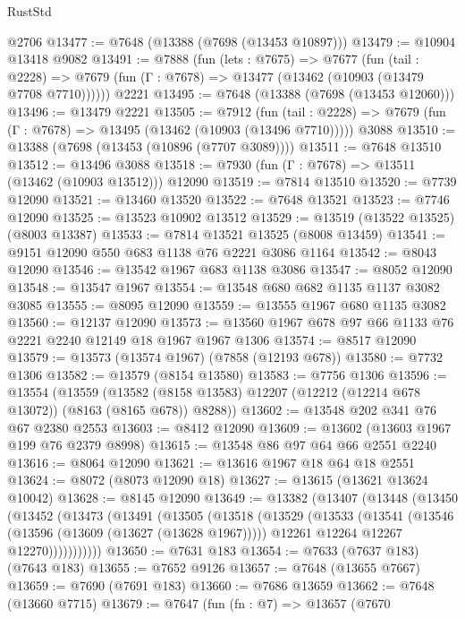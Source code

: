 \begin{lexlean}{RustStd}
\begin{coremodule}
{\begin{coremodule}
{{{{{{{{{{{{{{{{{{{{{{{{{{{{{{{{{{{{{{{{{{{{{{{{{{{{{    @2706
@13477 := @7648 (@13388 (@7698 (@13453 @10897)))
@13479 := @10904 @13418 @9082
@13491 := @7888
    (fun (lets : @7675) =>
    @7677
      (fun (tail : @2228) =>
      @7679 (fun (Γ : @7678) => @13477 (@13462 (@10903 (@13479 @7708 @7710))))))
    @2221
@13495 := @7648 (@13388 (@7698 (@13453 @12060)))
@13496 := @13479 @2221
@13505 := @7912
    (fun (tail : @2228) => @7679 (fun (Γ : @7678) => @13495 (@13462 (@10903 (@13496 @7710)))))
    @3088
@13510 := @13388 (@7698 (@13453 (@10896 (@7707 @3089))))
@13511 := @7648 @13510
@13512 := @13496 @3088
@13518 := @7930 (fun (Γ : @7678) => @13511 (@13462 (@10903 @13512))) @12090
@13519 := @7814 @13510
@13520 := @7739 @12090
@13521 := @13460 @13520
@13522 := @7648 @13521
@13523 := @7746 @12090
@13525 := @13523 @10902 @13512
@13529 := @13519 (@13522 @13525) (@8003 @13387)
@13533 := @7814 @13521 @13525 (@8008 @13459)
@13541 := @9151 @12090 @550 @683 @1138 @76 @2221 @3086 @1164
@13542 := @8043 @12090
@13546 := @13542 @1967 @683 @1138 @3086
@13547 := @8052 @12090
@13548 := @13547 @1967
@13554 := @13548 @680 @682 @1135 @1137 @3082 @3085
@13555 := @8095 @12090
@13559 := @13555 @1967 @680 @1135 @3082
@13560 := @12137 @12090
@13573 := @13560 @1967 @678 @97 @66 @1133 @76 @2221 @2240 @12149 @18 @1967 @1967 @1306
@13574 := @8517 @12090
@13579 := @13573 (@13574 @1967) (@7858 (@12193 @678))
@13580 := @7732 @1306
@13582 := @13579 (@8154 @13580)
@13583 := @7756 @1306
@13596 := @13554
    (@13559 (@13582 (@8158 @13583) @12207 (@12212 (@12214 @678 @13072)) (@8163 (@8165 @678)) @8288))
@13602 := @13548 @202 @341 @76 @67 @2380 @2553
@13603 := @8412 @12090
@13609 := @13602 (@13603 @1967 @199 @76 @2379 @8998)
@13615 := @13548 @86 @97 @64 @66 @2551 @2240
@13616 := @8064 @12090
@13621 := @13616 @1967 @18 @64 @18 @2551
@13624 := @8072 (@8073 @12090 @18)
@13627 := @13615 (@13621 @13624 @10042)
@13628 := @8145 @12090
@13649 := @13382
    (@13407
      (@13448
        (@13450
          (@13452
            (@13473
              (@13491
                (@13505
                  (@13518
                    (@13529
                      (@13533
                        (@13541
                          (@13546 (@13596 (@13609 (@13627 (@13628 @1967)))))
                          @12261
                          @12264
                          @12267
                          @12270)))))))))))
@13650 := @7631 @183
@13654 := @7633 (@7637 @183) (@7643 @183)
@13655 := @7652 @9126
@13657 := @7648 (@13655 @7667)
@13659 := @7690 (@7691 @183)
@13660 := @7686 @13659
@13662 := @7648 (@13660 @7715)
@13679 := @7647
    (fun (fn : @7) =>
    @13657
      (@7670
}}}}}}}}}}}}}}}}}}}}}}}}}}}}}}}}}}}}}}}}}}}}}}}}}}}}}
\end{coremodule}}
\end{coremodule}
\end{lexlean}
